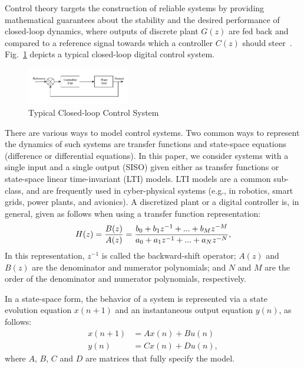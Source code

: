 \documentclass[10pt,conference]{IEEEtran}
\begin{document}
Control theory targets the construction of reliable systems by providing
mathematical guarantees about the stability and the desired performance of
closed-loop dynamics, where outputs of discrete plant $G(z)$ are fed back
and compared to a reference signal towards which a controller $C(z)$ should
steer~\cite{astrom1997computer}.  Fig.~\ref{fig:typical-control-system}
depicts a typical closed-loop digital control system.
%
\begin{figure}[ht!]
\centering
\includegraphics[width=0.4\textwidth]{closedloopseries.pdf}
\caption{Typical Closed-loop Control System}
\label{fig:typical-control-system}
\end{figure}


There are various ways to model control systems.  Two common ways to
represent the dynamics of such systems are transfer functions and
state-space equations (difference or differential equations).  In this
paper, we consider systems with a single input and a single output (SISO)
given either as transfer functions or state-space linear time-invariant
(LTI) models.  LTI models are a common sub-class, and are frequently used in
cyber-physical systems (e.g., in robotics, smart grids, power plants, and
avionics).  A discretized plant or a digital controller is, in general,
given as follows when using a transfer function representation:
%
\begin{equation}
\small
\label{eq:transferfunction}
H(z)=\frac{B(z)}{A(z)}=\frac{b_{0}+b_{1}z^{-1}+...+b_{M}z^{-M}}{a_{0}+a_{1}z^{-1}+...+a_{N}z^{-N}},
\end{equation}
%
In this representation, $z^{-1}$ is called the backward-shift operator;
$A(z)$ and $B(z)$ are the denominator and numerator polynomials; and $N$ and
$M$ are the order of the denominator and numerator polynomials, respectively.

In a state-space form, the behavior of a system is represented via a state
evolution equation $x(n+1)$ and an instantaneous output equation $y(n)$, as
follows:
%
\begin{equation}
\begin{split}
x(n+1) &= A x(n) + B u(n)
\\
y(n) &= C x(n) + D u(n), 
\end{split}\label{eq:ss-example}
\end{equation}
%
where $A$, $B$, $C$ and $D$ are matrices that fully specify the model. 
\end{document}
